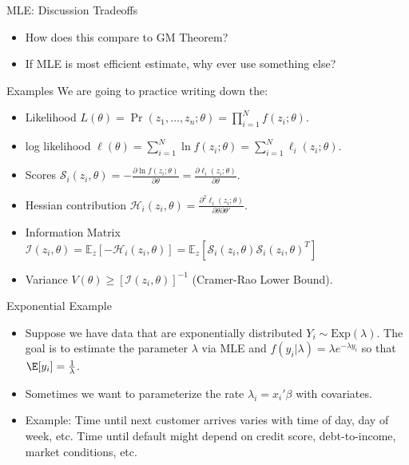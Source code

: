 \documentclass[aspectratio=169,11pt]{beamer}
\begin{document}
\begin{frame}{MLE: Discussion}
Tradeoffs
\begin{itemize}
\item How does this compare to GM Theorem?
\item If MLE is most efficient estimate, why ever use something else?
\end{itemize}
\end{frame}



\begin{frame}{Examples}
We are going to practice writing down the:
\begin{itemize}
\item Likelihood $L(\theta)= \Pr(z_1,\ldots,z_n ; \theta) = \prod_{i=1}^N f(z_i ; \theta)$.
\item log likelihood $\ell(\theta)= \sum_{i=1}^N \ln f(z_i ; \theta) = \sum_{i=1}^N \ell_i(z_i ; \theta)$.
\item Scores $\mathcal{S}_i(z_i, \theta) =-\frac{\partial \ln f(z_i ; \theta)}{\partial \theta}=\frac{\partial \ell_i(z_i ; \theta)}{\partial \theta}$.
\item Hessian contribution $\mathcal{H}_i(z_i, \theta) =\frac{\partial^2 \ell_i(z_i ; \theta)}{\partial \theta \partial \theta'}$.
\item Information Matrix $\mathcal{I}(z_i, \theta) = \mathbb{E}_z[-\mathcal{H}_i(z_i,\theta)]=\mathbb{E}_z[\mathcal{S}_i(z_i,\theta) \mathcal{S}_i(z_i,\theta)^T]$
\item Variance $V(\theta) \geq [\mathcal{I}(z_i, \theta)]^{-1} $ (Cramer-Rao Lower Bound).
\end{itemize}

\end{frame}


\begin{frame}{Exponential Example}
\begin{itemize}
\item Suppose we have data that are exponentially distributed $Y_i \sim \text{Exp}(\lambda)$. The goal is to estimate the parameter $\lambda$ via MLE and $f(y_i | \lambda) = \lambda e^{-\lambda y_i}$ so that $\E[y_i]=\frac{1}{\lambda}$.
\item Sometimes we want to parameterize the rate  $\lambda_i = x_i' \beta$ with covariates.
\item Example: Time until next customer arrives varies with time of day, day of week, etc. Time until default might depend on credit score, debt-to-income, market conditions, etc.
\end{itemize}
\end{frame}
\end{document}
